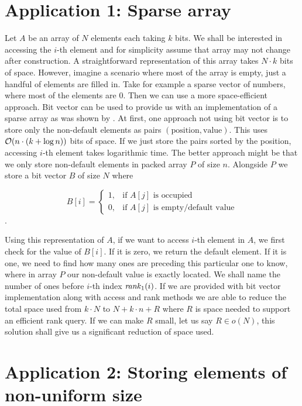 
\section{Application 1: Sparse array}

Let $A$ be an array of $N$ elements each taking $k$ bits. We shall be interested in
accessing the $i$-th element and for simplicity assume that array may not change
after construction. A straightforward representation of this array takes $N\cdot k$
bits of space. However, imagine a scenario where most of the array is empty, just a handful
of elements are filled in. Take for example a sparse vector of numbers, where most of the
elements are 0. Then we can use a more space-efficient approach. Bit vector can be used
to provide us with an implementation of a sparse array as was shown by \cite{grossi2013design}.
At first, one approach not using bit vector is to store only the non-default elements as
pairs $(\text{position}, \text{value})$. This uses $\mathcal{O}(n\cdot (k+\log n))$ bits of space.
If we just store the pairs sorted by the position, accessing $i$-th element takes logarithmic
time. The better approach might be that we only store non-default elements in packed array
$P$ of size $n$. Alongside $P$ we store a bit vector $B$ of size $N$ where

\[
   B[i]=
\begin{cases}
   1,& \text{if $A[j]$ is occupied} \\
   0,& \text{if $A[j]$ is empty/default value}
\end{cases}
\].

Using this representation of $A$, if we want to access $i$-th element in $A$, we first check for
the value of $B[i]$. If it is zero, we return the default element. If it is one, we need to find
how many ones are preceding this particular one to know, where in array $P$ our non-default
value is exactly located. We shall name the number of ones before $i$-th index
$\mathit{rank}_1(i)$. If we are provided with bit vector implementation along with access and
rank methods we are able to reduce the total space used from $k\cdot N$ to $N+k\cdot n+R$ where
$R$ is space needed to support an efficient rank query. If we can make $R$ small, let us say
$R\in o(N)$, this solution shall give us a significant reduction of space used.

\section{Application 2: Storing elements of non-uniform size}

